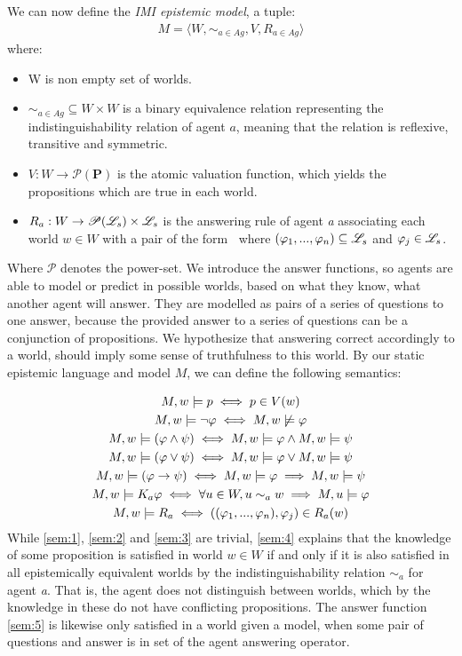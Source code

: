 We can now define the \textit{IMI epistemic model}, a tuple:
\begin{align}
    M = \langle W, \sim_{a\in Ag}, V, R_{a\in Ag}\rangle \label{eq:3}
\end{align}
where:
\begin{itemize}
    \setlength\itemsep{-0.4em}
    \item W is non empty set of worlds.
    \item $\sim_{a\in Ag} \subseteq W \times W$ is a binary equivalence relation representing the indistinguishability relation of agent $a$, meaning that the relation is reflexive, transitive and symmetric.
    \item $V : W \rightarrow \mathscr{P}(\mathbf{P})$ is the atomic valuation function, which yields the propositions which are true in each world.
    \item $R_a : W \rightarrow \mathscr{P}(\mathscr{L}_s) \times \mathscr{L}_s$ is the answering rule of agent \textit{a} associating each world $w \in W$ with a pair of the form \aset $\:$ where $(\varphi_1,...,\varphi_n) \subseteq \mathscr{L}_s$ and $\varphi_j \in \mathscr{L}_s$.
\end{itemize}
Where $\mathscr{P}$ denotes the power-set. We introduce the answer functions, so agents are able to model or predict in possible worlds, based on what they know, what another agent will answer. They are modelled as pairs of a series of questions to one answer, because the provided answer to a series of questions can be a conjunction of propositions. We hypothesize that answering correct accordingly to a world, should imply some sense of truthfulness to this world. By our static epistemic language \staticlang\: and model $M$, we can define the following semantics:

\begin{gather}
    M, w |= p \iff p \in V(w) \label{sem:1}\\
    M, w |= \neg\varphi \iff M, w \not\models \varphi \label{sem:2}\\
    M, w |= (\varphi \land \psi) \iff M, w |= \varphi \land M, w |= \psi \label{sem:3}\\
    M, w |= (\varphi \lor \psi) \iff M, w |= \varphi \lor M, w |= \psi\\
    M, w |= (\varphi \rightarrow \psi) \iff M, w |= \varphi \implies M, w |= \psi \\
    M, w |= K_a\varphi \iff \forall u\in W, u \sim_{a} w \implies M, u |= \varphi \label{sem:4} \\
    M, w |= R_a \iff ((\varphi_1,...,\varphi_n), \varphi_j) \in R_a(w) \label{sem:5}
\end{gather}
While \cref{sem:1}, \cref{sem:2} and \cref{sem:3} are trivial, \cref{sem:4} explains that the knowledge of some proposition \proposition is satisfied in world $w \in W$ if and only if it is also satisfied in all epistemically equivalent worlds by the indistinguishability relation $\sim_a$ for agent \textit{a}. That is, the agent does not distinguish between worlds, which by the knowledge in these do not have conflicting propositions. The answer function \cref{sem:5} is likewise only satisfied in a world given a model, when some pair of questions and answer is in set of the agent answering operator.

